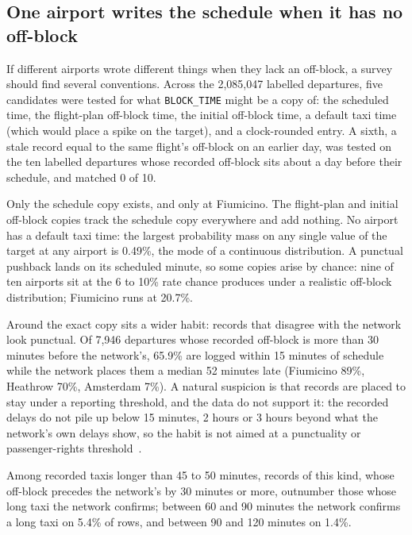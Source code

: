 \documentclass[
  manuscript=article,
  layout=preprint,
  year=2026,
  volume=x,
]{extra/joas}
\begin{document}
\subsection{One airport writes the schedule when it has no off-block}\label{sec:4.4}

If different airports wrote different things when they lack an off-block, a survey should find several conventions. Across the 2,085,047 labelled departures, five candidates were tested for what \texttt{BLOCK\_TIME} might be a copy of: the scheduled time, the flight-plan off-block time, the initial off-block time, a default taxi time (which would place a spike on the target), and a clock-rounded entry. A sixth, a stale record equal to the same flight's off-block on an earlier day, was tested on the ten labelled departures whose recorded off-block sits about a day before their schedule, and matched 0 of 10.

Only the schedule copy exists, and only at Fiumicino. The flight-plan and initial off-block copies track the schedule copy everywhere and add nothing. No airport has a default taxi time: the largest probability mass on any single value of the target at any airport is 0.49\%, the mode of a continuous distribution. A punctual pushback lands on its scheduled minute, so some copies arise by chance: nine of ten airports sit at the 6 to 10\% rate chance produces under a realistic off-block distribution; Fiumicino runs at 20.7\%.

Around the exact copy sits a wider habit: records that disagree with the network look punctual. Of 7,946 departures whose recorded off-block is more than 30 minutes before the network's, 65.9\% are logged within 15 minutes of schedule while the network places them a median 52 minutes late (Fiumicino 89\%, Heathrow 70\%, Amsterdam 7\%). A natural suspicion is that records are placed to stay under a reporting threshold, and the data do not support it: the recorded delays do not pile up below 15 minutes, 2 hours or 3 hours beyond what the network's own delays show, so the habit is not aimed at a punctuality or passenger-rights threshold~\cite{ec261_2004}.

Among recorded taxis longer than 45 to 50 minutes, records of this kind, whose off-block precedes the network's by 30 minutes or more, outnumber those whose long taxi the network confirms; between 60 and 90 minutes the network confirms a long taxi on 5.4\% of rows, and between 90 and 120 minutes on 1.4\%.
\end{document}
